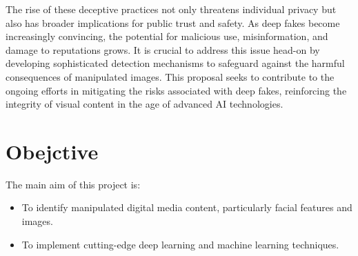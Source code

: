         The rise of these deceptive practices not only threatens individual privacy but also has broader implications for public trust and safety. As deep fakes become increasingly convincing, the potential for malicious use, misinformation, and damage to reputations grows. It is crucial to address this issue head-on by developing sophisticated detection mechanisms to safeguard against the harmful consequences of manipulated images. This proposal seeks to contribute to the ongoing efforts in mitigating the risks associated with deep fakes, reinforcing the integrity of visual content in the age of advanced AI technologies.
       \section{Obejctive}
            The main aim of this project is:
            \begin{itemize}
                \item To identify manipulated digital media content, particularly facial features and images.
                \item To implement cutting-edge deep learning and machine learning techniques.
            \end{itemize}